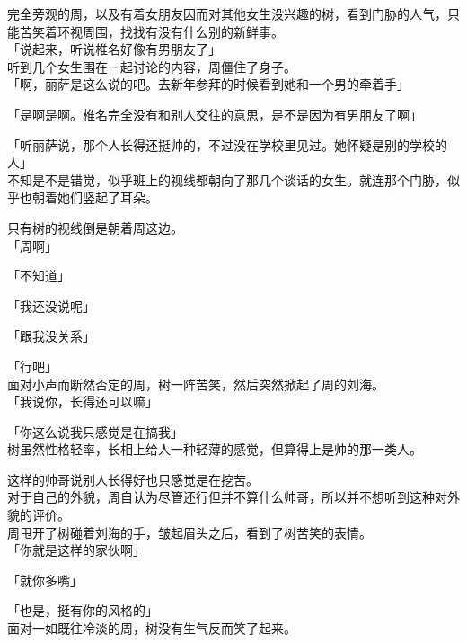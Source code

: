 完全旁观的周，以及有着女朋友因而对其他女生没兴趣的树，看到门胁的人气，只能苦笑着环视周围，找找有没有什么别的新鲜事。\\

「说起来，听说椎名好像有男朋友了」\\

听到几个女生围在一起讨论的内容，周僵住了身子。\\

「啊，丽萨是这么说的吧。去新年参拜的时候看到她和一个男的牵着手」

「是啊是啊。椎名完全没有和别人交往的意思，是不是因为有男朋友了啊」

「听丽萨说，那个人长得还挺帅的，不过没在学校里见过。她怀疑是别的学校的人」\\

不知是不是错觉，似乎班上的视线都朝向了那几个谈话的女生。就连那个门胁，似乎也朝着她们竖起了耳朵。

只有树的视线倒是朝着周这边。\\

「周啊」

「不知道」

「我还没说呢」

「跟我没关系」

「行吧」\\

面对小声而断然否定的周，树一阵苦笑，然后突然掀起了周的刘海。\\

「我说你，长得还可以嘛」

「你这么说我只感觉是在搞我」\\

树虽然性格轻率，长相上给人一种轻薄的感觉，但算得上是帅的那一类人。

这样的帅哥说别人长得好也只感觉是在挖苦。\\

对于自己的外貌，周自认为尽管还行但并不算什么帅哥，所以并不想听到这种对外貌的评价。\\

周甩开了树碰着刘海的手，皱起眉头之后，看到了树苦笑的表情。\\

「你就是这样的家伙啊」

「就你多嘴」

「也是，挺有你的风格的」\\

面对一如既往冷淡的周，树没有生气反而笑了起来。\\

\vspace{2\baselineskip}

